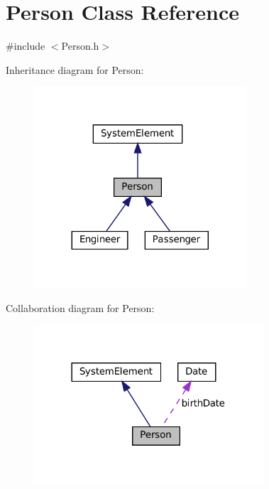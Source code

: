\hypertarget{classPerson}{}\section{Person Class Reference}
\label{classPerson}


{\ttfamily \#include $<$Person.\+h$>$}



Inheritance diagram for Person\+:
\nopagebreak
\begin{figure}[H]
\begin{center}
\leavevmode
\includegraphics[width=224pt]{classPerson__inherit__graph}
\end{center}
\end{figure}


Collaboration diagram for Person\+:
\nopagebreak
\begin{figure}[H]
\begin{center}
\leavevmode
\includegraphics[width=242pt]{classPerson__coll__graph}
\end{center}
\end{figure}
